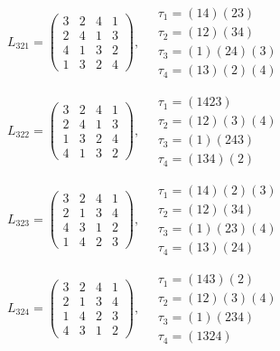 $L_{321} = \begin{pmatrix} 3 & 2 & 4 & 1 \\ 2 & 4 & 1 & 3 \\ 4 & 1 & 3 & 2 \\ 1 & 3 & 2 & 4 \end{pmatrix}, \quad \begin{matrix} \tau_{1} = (1 4)(2 3) \\ \tau_{2} = (1 2)(3 4) \\ \tau_{3} = (1)(2 4)(3) \\ \tau_{4} = (1 3)(2)(4) \end{matrix}$

$L_{322} = \begin{pmatrix} 3 & 2 & 4 & 1 \\ 2 & 4 & 1 & 3 \\ 1 & 3 & 2 & 4 \\ 4 & 1 & 3 & 2 \end{pmatrix}, \quad \begin{matrix} \tau_{1} = (1 4 2 3) \\ \tau_{2} = (1 2)(3)(4) \\ \tau_{3} = (1)(2 4 3) \\ \tau_{4} = (1 3 4)(2) \end{matrix}$

$L_{323} = \begin{pmatrix} 3 & 2 & 4 & 1 \\ 2 & 1 & 3 & 4 \\ 4 & 3 & 1 & 2 \\ 1 & 4 & 2 & 3 \end{pmatrix}, \quad \begin{matrix} \tau_{1} = (1 4)(2)(3) \\ \tau_{2} = (1 2)(3 4) \\ \tau_{3} = (1)(2 3)(4) \\ \tau_{4} = (1 3)(2 4) \end{matrix}$

$L_{324} = \begin{pmatrix} 3 & 2 & 4 & 1 \\ 2 & 1 & 3 & 4 \\ 1 & 4 & 2 & 3 \\ 4 & 3 & 1 & 2 \end{pmatrix}, \quad \begin{matrix} \tau_{1} = (1 4 3)(2) \\ \tau_{2} = (1 2)(3)(4) \\ \tau_{3} = (1)(2 3 4) \\ \tau_{4} = (1 3 2 4) \end{matrix}$

